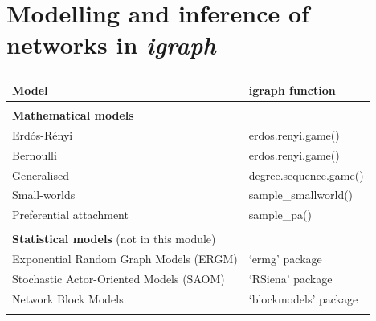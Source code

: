 \documentclass[8pt]{beamer}
\begin{document}
\section{Modelling and inference of networks in \textit{igraph}}


\bgroup
{}
\begin{frame}[plain]{}
\begin{center}
\color{white}{\Huge\insertsection}
\end{center}
\end{frame}
\egroup


\begin{frame}
\frametitle{\insertsection}

\centering
\footnotesize
\begin{tabular}{ll}
\toprule
\textbf{Model} & \textbf{igraph function}\\
\hline
\\
\textbf{Mathematical models}\\
Erd\'os-R\'enyi 							& erdos.renyi.game()\\
Bernoulli									& erdos.renyi.game()\\
Generalised									& degree.sequence.game()\\
Small-worlds			    				& sample\_smallworld()\\
Preferential attachment 					& sample\_pa()\\
\\
\textbf{Statistical models} (not in this module)\\
Exponential Random Graph Models (ERGM)  		& `ermg' package\\
Stochastic Actor-Oriented Models (SAOM) 		& `RSiena' package\\
Network Block Models						& `blockmodels' package\\
\\
\bottomrule
\end{tabular}

\end{frame}

\end{document}
